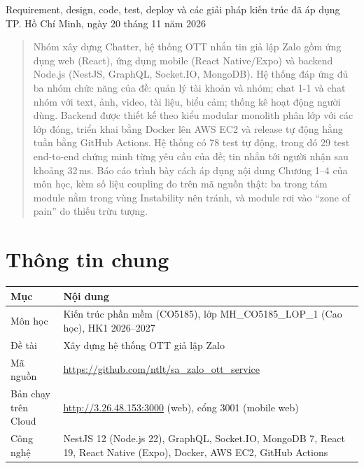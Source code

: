 \documentclass[11pt, a4paper]{article}
\begin{document}
\sloppy   %

          {Requirement, design, code, test, deploy và các giải pháp kiến trúc đã áp dụng}
          {TP. Hồ Chí Minh, ngày 20 tháng 11 năm 2026}

\begin{abstract}
Nhóm xây dựng Chatter, hệ thống OTT nhắn tin giả lập Zalo gồm ứng dụng web (React), ứng dụng mobile (React Native/Expo) và backend Node.js (NestJS, GraphQL, Socket.IO, MongoDB). Hệ thống đáp ứng đủ ba nhóm chức năng của đề: quản lý tài khoản và nhóm; chat 1-1 và chat nhóm với text, ảnh, video, tài liệu, biểu cảm; thống kê hoạt động người dùng. Backend được thiết kế theo kiểu modular monolith phân lớp với các lớp đóng, triển khai bằng Docker lên AWS EC2 và release tự động hằng tuần bằng GitHub Actions. Hệ thống có 78 test tự động, trong đó 29 test end-to-end chứng minh từng yêu cầu của đề; tin nhắn tới người nhận sau khoảng 32\,ms. Báo cáo trình bày cách áp dụng nội dung Chương 1--4 của môn học, kèm số liệu coupling đo trên mã nguồn thật: ba trong tám module nằm trong vùng Instability nên tránh, và module  rơi vào ``zone of pain'' do thiếu trừu tượng.
\end{abstract}

\tableofcontents
\newpage

\section{Thông tin chung}

\begin{table}[H]
  \centering
  \small
  \begin{tabularx}{\linewidth}{lY}
    \toprule
    \textbf{Mục} & \textbf{Nội dung} \\
    \midrule
    Môn học & Kiến trúc phần mềm (CO5185), lớp MH\_CO5185\_LOP\_1 (Cao học), HK1 2026--2027 \\
    Đề tài & Xây dựng hệ thống OTT giả lập Zalo~\cite{detai2026} \\
    Mã nguồn & \url{https://github.com/ntlt/sa_zalo_ott_service} \\
    Bản chạy trên Cloud & \url{http://3.26.48.153:3000} (web), cổng 3001 (mobile web) \\
    Công nghệ & NestJS 12 (Node.js 22), GraphQL, Socket.IO, MongoDB 7, React 19, React Native (Expo), Docker, AWS EC2, GitHub Actions \\
    \bottomrule
  \end{tabularx}
\end{table}
\end{document}
